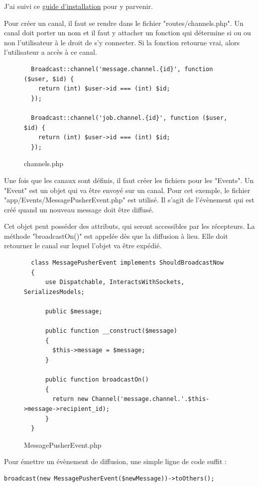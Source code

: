 \documentclass[
    iai, %
    eai, %
]{heig-tb}
\begin{document}
J'ai suivi ce \href{https://beyondco.de/docs/laravel-websockets/getting-started/installation}{guide d'installation} pour y parvenir.

Pour créer un canal, il faut se rendre dans le fichier "routes/channels.php". Un canal doit porter un nom et il faut y attacher un fonction qui détermine si ou ou non l'utilisateur à le droit de s'y connecter. Si la fonction retourne vrai, alors l'utilisateur a accès à ce canal.

\begin{figure}[h]
  \begin{verbatim}
  Broadcast::channel('message.channel.{id}', function ($user, $id) {
    return (int) $user->id === (int) $id;
  });

  Broadcast::channel('job.channel.{id}', function ($user, $id) {
    return (int) $user->id === (int) $id;
  });
  \end{verbatim}
  \caption{channels.php}
\end{figure}

Une fois que les canaux sont définis, il faut créer les fichiers pour les "Events". Un "Event" est un objet qui va être envoyé sur un canal. Pour cet exemple, le fichier "app/Events/MessagePusherEvent.php" est utilisé. Il s'agit de l'évènement qui est créé quand un nouveau message doit être diffusé.

Cet objet peut posséder des attributs, qui seront accessibles par les récepteurs. La méthode "broadcastOn()" est appelée dès que la diffusion à lieu. Elle doit retourner le canal sur lequel l'objet va être expédié.

\begin{figure}[h]
  \begin{verbatim}
  class MessagePusherEvent implements ShouldBroadcastNow
  {
      use Dispatchable, InteractsWithSockets, SerializesModels;

      public $message;

      public function __construct($message)
      {
        $this->message = $message;
      }

      public function broadcastOn()
      {
        return new Channel('message.channel.'.$this->message->recipient_id);
      }
  }
  \end{verbatim}
  \caption{MessagePusherEvent.php}
\end{figure}

Pour émettre un évènement de diffusion, une simple ligne de code suffit :
\begin{verbatim}
broadcast(new MessagePusherEvent($newMessage))->toOthers();
\end{verbatim}
\end{document}
